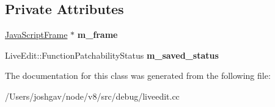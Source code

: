 \subsection*{Private Attributes}
\begin{DoxyCompactItemize}
\item 
\hyperlink{classv8_1_1internal_1_1_java_script_frame}{Java\+Script\+Frame} $\ast$ {\bfseries m\+\_\+frame}\hypertarget{classv8_1_1internal_1_1_single_frame_target_a7558cded052c1b7aea774922cb7c5a20}{}\label{classv8_1_1internal_1_1_single_frame_target_a7558cded052c1b7aea774922cb7c5a20}

\item 
Live\+Edit\+::\+Function\+Patchability\+Status {\bfseries m\+\_\+saved\+\_\+status}\hypertarget{classv8_1_1internal_1_1_single_frame_target_a4386ee6e44f6621ad0fc8cbcac6d0e6e}{}\label{classv8_1_1internal_1_1_single_frame_target_a4386ee6e44f6621ad0fc8cbcac6d0e6e}

\end{DoxyCompactItemize}


The documentation for this class was generated from the following file\+:\begin{DoxyCompactItemize}
\item 
/\+Users/joshgav/node/v8/src/debug/liveedit.\+cc\end{DoxyCompactItemize}
